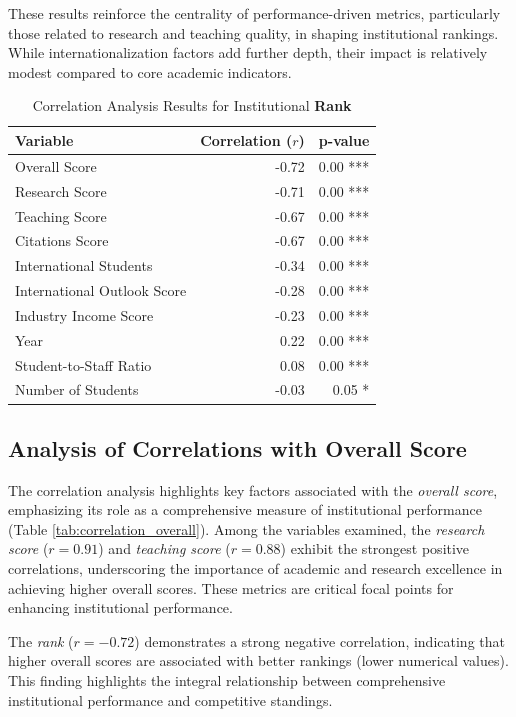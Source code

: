 \documentclass[conference]{IEEEtran}
\begin{document}
These results reinforce the centrality of performance-driven metrics, particularly those related to research and teaching quality, in shaping institutional rankings. While internationalization factors add further depth, their impact is relatively modest compared to core academic indicators.

\begin{table}[h!]
	\centering
	\caption{Correlation Analysis Results for Institutional \textbf{Rank}}
	\label{tab:correlation_rank}
	\begin{tabular}{|l|r|r|}
		\hline
		\textbf{Variable} & \textbf{Correlation ($r$)} & \textbf{p-value} \\
		\hline
		Overall Score & -0.72 & 0.00 *** \\
		Research Score & -0.71 & 0.00 *** \\
		Teaching Score & -0.67 & 0.00 *** \\
		Citations Score & -0.67 & 0.00 *** \\
		International Students & -0.34 & 0.00 *** \\
		International Outlook Score & -0.28 & 0.00 *** \\
		Industry Income Score & -0.23 & 0.00 *** \\
		Year & 0.22 & 0.00 *** \\
		Student-to-Staff Ratio & 0.08 & 0.00 *** \\
		Number of Students & -0.03 & 0.05 * \\
		\hline
	\end{tabular}
\end{table}

\subsection{Analysis of Correlations with Overall Score}

The correlation analysis highlights key factors associated with the \textit{overall score}, emphasizing its role as a comprehensive measure of institutional performance (Table \ref{tab:correlation_overall}). Among the variables examined, the \textit{research score} ($r = 0.91$) and \textit{teaching score} ($r = 0.88$) exhibit the strongest positive correlations, underscoring the importance of academic and research excellence in achieving higher overall scores. These metrics are critical focal points for enhancing institutional performance.

The \textit{rank} ($r = -0.72$) demonstrates a strong negative correlation, indicating that higher overall scores are associated with better rankings (lower numerical values). This finding highlights the integral relationship between comprehensive institutional performance and competitive standings.
\end{document}
